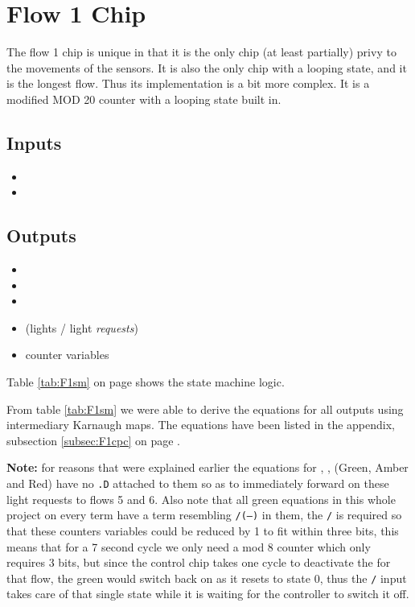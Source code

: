 \section{Flow 1 Chip}
The flow 1 chip is unique in that it is the only chip (at least partially)
privy to the movements of the sensors. It is also the only chip with a looping
state, and it is the longest flow. Thus its implementation is a bit more
complex. It is a modified MOD 20 counter with a looping state built in. 

\subsection{Inputs}
\begin{itemize}
  \item \nS
  \item \EN{}
\end{itemize}

\subsection{Outputs}
\begin{itemize}
  \item \FF
  \item \nGr
  \item \nAm
  \item \nRed (lights / light \emph{requests})
  \item \Q{[0\ldots4]} counter variables
\end{itemize}

Table \ref{tab:F1sm} on page \pageref{tab:F1sm} shows the state machine logic.

From table \ref{tab:F1sm} we were able to derive the equations for all
outputs using intermediary Karnaugh maps. The equations have been listed in the
appendix, subsection \ref{subsec:F1cpc} on page \pageref{subsec:F1cpc}.

\textbf{Note:} for reasons that were explained earlier the equations for \nGr,
\nAm, \nRed(Green, Amber and Red) have no \texttt{.D} attached to them so as to
immediately forward on these light requests to flows 5 and 6. Also note that all
green equations in this whole project on every term have a term resembling
\texttt{/\nAm*\EN*(---)} in them, the \texttt{/\nAm} is required so that these
counters variables could be reduced by 1 to fit within three bits, this means
that for a 7 second cycle we only need a mod 8 counter which only requires
3 bits, but since the control chip takes one cycle to deactivate the \EN for
that flow, the green would switch back on as it resets to state 0, thus the
\texttt{/\nAm} input takes care of that single state while it is waiting for
the controller to switch it off. 